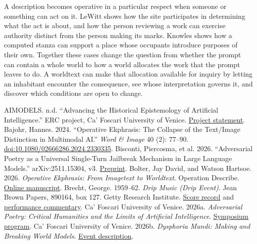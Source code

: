 \documentclass[11pt,letterpaper]{article}
\newcommand{\work}[1]{\textit{#1}}
\newcommand{\src}[2]{\href{#1}{#2}}
\begin{document}
A description becomes operative in a particular respect when someone or something can act on it. LeWitt shows how the site participates in determining what the act is about, and how the person reviewing a work can exercise authority distinct from the person making its marks. Knowles shows how a computed stanza can support a place whose occupants introduce purposes of their own. Together these cases change the question from whether the prompt can contain a whole world to how a world allocates the work that the prompt leaves to do. A worldtext can make that allocation available for inquiry by letting an inhabitant encounter the consequence, see whose interpretation governs it, and discover which conditions are open to change.

\clearpage
\begin{thebibliography}{99}
\small\raggedright
\setlength{\itemsep}{4pt}
 AIMODELS. n.d. “Advancing the Historical Epistemology of Artificial Intelligence.” ERC project, Ca’ Foscari University of Venice. \src{https://pric.unive.it/projects/ai-models/home}{Project statement}.
 Bajohr, Hannes. 2024. “Operative Ekphrasis: The Collapse of the Text/Image Distinction in Multimodal AI.” \work{Word \& Image} 40 (2): 77–90. \src{https://doi.org/10.1080/02666286.2024.2330335}{doi:10.1080/02666286.2024.2330335}.
 Bisconti, Piercosma, et al. 2026. “Adversarial Poetry as a Universal Single-Turn Jailbreak Mechanism in Large Language Models.” arXiv:2511.15304, v3. \src{https://arxiv.org/html/2511.15304v3}{Preprint}.
 Bolter, Jay David, and Watson Hartsoe. 2026. \work{Operative Ekphrasis: From Imagetext to Worldtext}. Operation Describe. \src{https://hartswf0.github.io/operation-describe/Dry-Dock/FINAL_SHIPWORTHY.html}{Online manuscript}.
 Brecht, George. 1959–62. \work{Drip Music (Drip Event)}. Jean Brown Papers, 890164, box 127. Getty Research Institute. \src{https://www.getty.edu/publications/scores/object-index/346/}{Score record} and \src{https://www.getty.edu/publications/scores/06/commentary/}{performance commentary}.
 Ca’ Foscari University of Venice. 2026a. \work{Adversarial Poetry: Critical Humanities and the Limits of Artificial Intelligence}. \src{https://www.unive.it/web/en/19108/home/}{Symposium program}.
 Ca’ Foscari University of Venice. 2026b. \work{Dysphoria Mundi: Making and Breaking World Models}. \src{https://www.unive.it/data/33113/8/118968}{Event description}.

\end{thebibliography}
\end{document}
